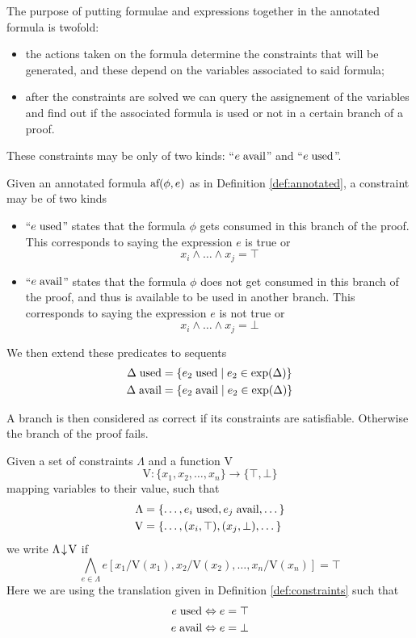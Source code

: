 \documentclass[a4paper, 12pt, english]{report}
\begin{document}
\noindent The purpose of putting formulae and expressions together in the annotated formula is twofold:
\begin{itemize}
	\item the actions taken on the formula determine the constraints that will be generated, and these depend on the variables associated to said formula;
	\item after the constraints are solved we can query the assignement of the variables and find out if the associated formula is used or not in a certain branch of a proof.
\end{itemize}
These constraints may be only of two kinds: ``$e \; \text{avail}$'' and ``$e \; \text{used}$''.
\begin{define}[Constraints]
	\label{def:constraints}
	Given an annotated formula $\text{af}(\phi, e)$ as in Definition \ref{def:annotated}, a constraint may be of two kinds
	\begin{itemize}
		\item ``$e \; \text{used}$'' states that the formula $\phi$ gets consumed in this branch of the proof.
			This corresponds to saying the expression $e$ is true or
			$$ x_i \wedge \dots \wedge x_j = \top $$
		\item ``$e \; \text{avail}$'' states that the formula $\phi$ does not get consumed in this branch of the proof, and thus is available to be used in another branch.
			This corresponds to saying the expression $e$ is not true or
			$$ x_i \wedge \dots \wedge x_j = \bot $$
	\end{itemize}
	We then extend these predicates to sequents
	\begin{align*}
		\Delta \; \text{used} &= \{ e_2 \; \text{used} \mid e_2 \in \text{exp}(\Delta) \} \\
		\Delta \; \text{avail} &= \{ e_2 \; \text{avail} \mid e_2 \in \text{exp}(\Delta) \}
	\end{align*}
\end{define}
A branch is then considered as correct if its constraints are satisfiable.
Otherwise the branch of the proof fails.
\begin{define}
	\label{def:sat}
	Given a set of constraints $\Lambda$ and a function V
	$$ \text{V} : \{ x_1, x_2, \dots, x_n \} \rightarrow \{ \top, \bot \} $$
	mapping variables to their value, such that
	\begin{align*}
		\Lambda &= \{ \dots, e_i \; \text{used}, e_j \; \text{avail}, \dots \} \\
		\text{V}&= \{ \dots, (x_i, \top), (x_j, \bot), \dots \}
	\end{align*}
	we write $\Lambda\!\downarrow\!\text{V}$ if 
	$$ \bigwedge_{e \in \Lambda} e[x_1 / \text{V}(x_1), x_2 / \text{V}(x_2), \dots, x_n / \text{V}(x_n)] = \top $$
	Here we are using the translation given in Definition \ref{def:constraints} such that
	\begin{align*}
		e \; \text{used} &\Leftrightarrow e = \top \\
		e \; \text{avail} &\Leftrightarrow e = \bot
	\end{align*}
\end{define}
\end{document}
